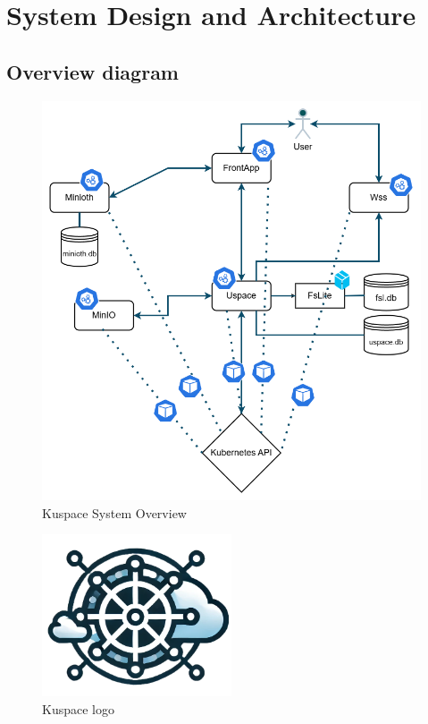 \chapter{System Design and Architecture}
\label{Chapter-SystemDesign-Architecture}



\section{Overview diagram}
\begin{figure}[h!]
  \centering
  \includegraphics[width=1\textwidth]{Images/kuspace-overview.png}
  \caption{Kuspace System Overview}
  \label{fig:kuspace-overview}
\end{figure}


\begin{figure}[h!]
  \centering
  \includegraphics[width=0.5\textwidth]{Images/kuspace-logo.png}
  \caption{Kuspace logo}
  \label{fig:kuspace-overview}
\end{figure}



